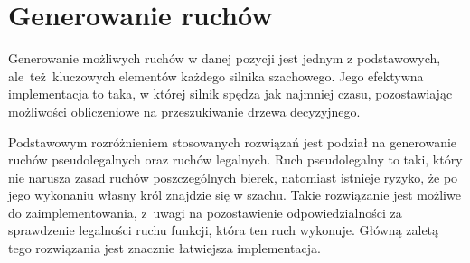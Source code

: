\section{Generowanie ruchów}
\label{sec:generowanie-ruchow}

Generowanie możliwych ruchów w danej pozycji jest jednym z podstawowych, ale~też~kluczowych elementów każdego silnika szachowego.
Jego efektywna implementacja to taka, w której silnik spędza jak najmniej czasu, pozostawiając możliwości obliczeniowe na przeszukiwanie drzewa decyzyjnego.

Podstawowym rozróżnieniem stosowanych rozwiązań jest podział na generowanie ruchów pseudolegalnych oraz ruchów legalnych.
Ruch pseudolegalny to taki, który nie narusza zasad ruchów poszczególnych bierek, natomiast istnieje ryzyko, że po jego wykonaniu własny król znajdzie się w szachu.
Takie rozwiązanie jest możliwe do zaimplementowania, z~uwagi na pozostawienie odpowiedzialności za sprawdzenie legalności ruchu funkcji, która ten ruch wykonuje.
Główną zaletą tego rozwiązania jest znacznie łatwiejsza implementacja.




